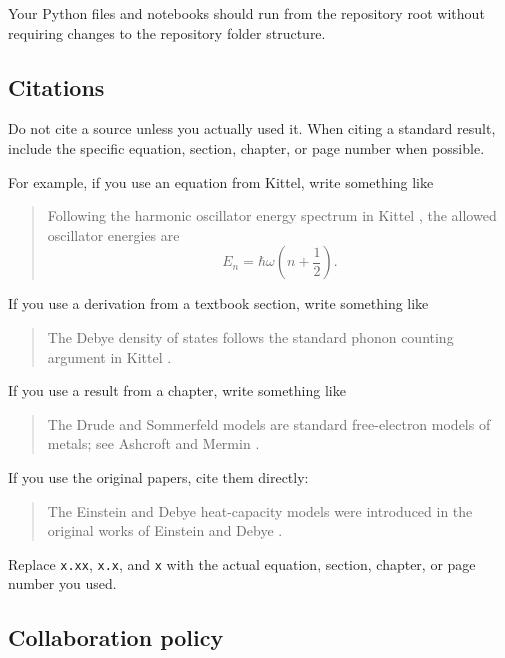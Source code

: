 Your Python files and notebooks should run from the repository root without requiring changes to the repository folder structure.

\subsection{Citations}

Do not cite a source unless you actually used it. When citing a standard result, include the specific equation, section, chapter, or page number when possible.

For example, if you use an equation from Kittel, write something like

\begin{quote}
Following the harmonic oscillator energy spectrum in Kittel \cite[Eq.~(x.xx)]{kittel2005solidstate}, the allowed oscillator energies are
\[
E_n=\hbar\omega\left(n+\frac{1}{2}\right).
\]
\end{quote}

If you use a derivation from a textbook section, write something like

\begin{quote}
The Debye density of states follows the standard phonon counting argument in Kittel \cite[Sec.~x.x]{kittel2005solidstate}.
\end{quote}

If you use a result from a chapter, write something like

\begin{quote}
The Drude and Sommerfeld models are standard free-electron models of metals; see Ashcroft and Mermin \cite[Ch.~x]{ashcroft1976solidstate}.
\end{quote}

If you use the original papers, cite them directly:

\begin{quote}
The Einstein and Debye heat-capacity models were introduced in the original works of Einstein \cite{einstein1907specificheat} and Debye \cite{debye1912specificheat}.
\end{quote}

Replace \texttt{x.xx}, \texttt{x.x}, and \texttt{x} with the actual equation, section, chapter, or page number you used.

\subsection{Collaboration policy}

